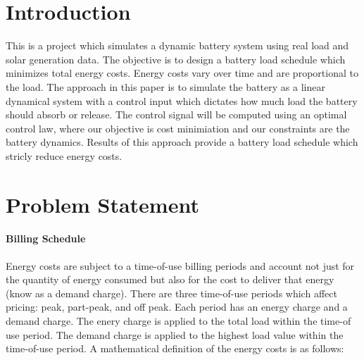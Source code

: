 \documentclass[12pt]{article}
\begin{document}
\maketitle

\section{Introduction}
This is a project which simulates a dynamic battery system using real load and solar generation data. The objective is to design a battery load schedule which minimizes total energy costs. Energy costs vary over time and are proportional to the load. The approach in this paper is to simulate the battery as a linear dynamical system with a control input which dictates how much load the battery should absorb or release. The control signal will be computed using an optimal control law, where our objective is cost minimiation and our constraints are the battery dynamics. Results of this approach provide a battery load schedule which stricly reduce energy costs. 

\section{Problem Statement}\label{problem statement}
\paragraph{Billing Schedule}
Energy costs are subject to a time-of-use billing periods and account not just for the quantity of energy consumed but also for the cost to deliver that energy (know as a demand charge). There are three time-of-use periods which affect pricing: peak, part-peak, and off peak. Each period has an energy charge and a demand charge. The enery charge is applied to the total load within the time-of use period. The demand charge is applied to the highest load value within the time-of-use period. A mathematical definition of the energy costs is as follows: 
\end{document}
